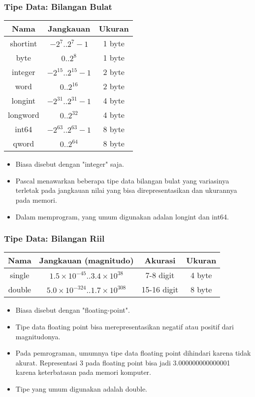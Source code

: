 \documentclass{beamer}
\begin{document}
\begin{frame}
\frametitle{Tipe Data: Bilangan Bulat}
\begin{tabular}{|c|c|c|}
	\hline Nama  & Jangkauan  & Ukuran \\ 
	\hline shortint & $-2^7 .. 2^7-1$ & 1 byte \\ 
	\hline byte & $0 .. 2^8$ & 1 byte\\ 
	\hline integer & $-2^{15} .. 2^{15}-1$ & 2 byte\\ 
	\hline word & $0 .. 2^{16}$ & 2 byte\\ 
	\hline longint & $-2^{31} .. 2^{31}-1$ & 4 byte\\ 
	\hline longword & $0 .. 2^{32}$ & 4 byte\\ 
	\hline int64 & $-2^{63} .. 2^{63}-1$ & 8 byte\\ 
	\hline qword & $0 .. 2^{64}$ & 8 byte\\ 
	\hline 
\end{tabular} 
\begin{itemize}
	\item Biasa disebut dengan "integer" saja.
	\item Pascal menawarkan beberapa tipe data bilangan bulat yang variasinya terletak pada jangkauan nilai yang bisa direpresentasikan dan ukurannya pada memori.
	\item Dalam memprogram, yang umum digunakan adalan \alert{longint} dan \alert{int64}.
\end{itemize}
\end{frame}

\begin{frame}
\frametitle{Tipe Data: Bilangan Riil}
\begin{tabular}{|c|c|c|c|}
	\hline Nama  & Jangkauan (magnitudo) & Akurasi & Ukuran \\ 
	\hline single & $1.5\times10^{-45} .. 3.4\times10^{38}$ & 7-8 digit & 4 byte\\ 
	\hline double & $5.0\times10^{-324} .. 1.7\times10^{308}$ & 15-16 digit & 8 byte \\ 
	\hline 
\end{tabular} 
\begin{itemize}
	\item Biasa disebut dengan "floating-point".
	\item Tipe data floating point bisa merepresentasikan negatif atau positif dari magnitudonya.
	\item Pada pemrograman, umumnya tipe data floating point dihindari karena tidak akurat. Representasi 3 pada floating point bisa jadi 3.000000000000001 karena keterbatasan pada memori komputer.
	\item Tipe yang umum digunakan adalah double.
\end{itemize}
\end{frame}
\end{document}
